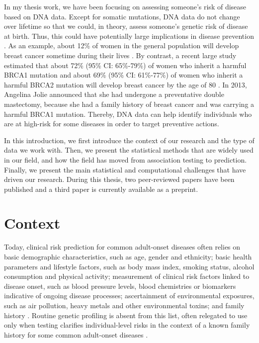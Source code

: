 In my thesis work, we have been focusing on assessing someone's risk of disease based on DNA data. Except for somatic mutations, DNA data do not change over lifetime so that we could, in theory, assess someone's genetic risk of disease at birth. Thus, this could have potentially large implications in disease prevention \cite[]{mavaddat2015prediction,pashayan2015implications}.
As an example, about 12\% of women in the general population will develop breast cancer sometime during their lives \cite[]{desantis2016breast}. By contrast, a recent large study estimated that about 72\% (95\% CI: 65\%-79\%) of women who inherit a harmful BRCA1 mutation and about 69\% (95\% CI: 61\%-77\%) of women who inherit a harmful BRCA2 mutation will develop breast cancer by the age of 80 \cite[]{kuchenbaecker2017risks}. 
In 2013, Angelina Jolie announced that she had undergone a preventative double mastectomy, because she had a family history of breast cancer and was carrying a harmful BRCA1 mutation.
Thereby, DNA data can help identify individuals who are at high-risk for some diseases in order to target preventive actions.

In this introduction, we first introduce the context of our research and the type of data we work with. Then, we present the statistical methods that are widely used in our field, and how the field has moved from association testing to prediction. Finally, we present the main statistical and computational challenges that have driven our research. During this thesis, two peer-reviewed papers have been published and a third paper is currently available as a preprint.

\section{Context}

Today, clinical risk prediction for common adult-onset diseases often relies on basic demographic characteristics, such as age, gender and ethnicity; basic health parameters and lifestyle factors, such as body mass index, smoking status, alcohol consumption and physical activity; measurement of clinical risk factors linked to disease onset, such as blood pressure levels, blood chemistries or biomarkers indicative of ongoing disease processes; ascertainment of environmental exposures, such as air pollution, heavy metals and other environmental toxins; and family history \cite[]{torkamani2018personal}.
Routine genetic profiling is absent from this list, often relegated to use only when testing clarifies individual-level risks in the context of a known family history for some common adult-onset
diseases \cite[]{torkamani2018personal}.

